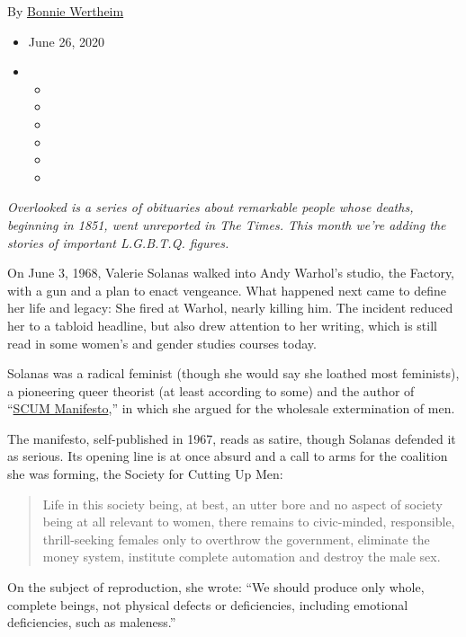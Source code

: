 By \href{https://www.nytimes.com/by/bonnie-wertheim}{Bonnie Wertheim}

\begin{itemize}
\item
  June 26, 2020
\item
  \begin{itemize}
  \item
  \item
  \item
  \item
  \item
  \item
  \end{itemize}
\end{itemize}

\emph{Overlooked is a series of obituaries about remarkable people whose
deaths, beginning in 1851, went unreported in The Times. This month
we're adding the stories of important L.G.B.T.Q. figures.}

On June 3, 1968, Valerie Solanas walked into Andy Warhol's studio, the
Factory, with a gun and a plan to enact vengeance. What happened next
came to define her life and legacy: She fired at Warhol, nearly killing
him. The incident reduced her to a tabloid headline, but also drew
attention to her writing, which is still read in some women's and gender
studies courses today.

Solanas was a radical feminist (though she would say she loathed most
feminists), a pioneering queer theorist (at least according to some) and
the author of
``\href{http://kunsthallezurich.ch/sites/default/files/scum_manifesto.pdf}{SCUM
Manifesto},'' in which she argued for the wholesale extermination of
men.

The manifesto, self-published in 1967, reads as satire, though Solanas
defended it as serious. Its opening line is at once absurd and a call to
arms for the coalition she was forming, the Society for Cutting Up Men:

\begin{quote}
Life in this society being, at best, an utter bore and no aspect of
society being at all relevant to women, there remains to civic-minded,
responsible, thrill-seeking females only to overthrow the government,
eliminate the money system, institute complete automation and destroy
the male sex.
\end{quote}

On the subject of reproduction, she wrote: ``We should produce only
whole, complete beings, not physical defects or deficiencies, including
emotional deficiencies, such as maleness.''

